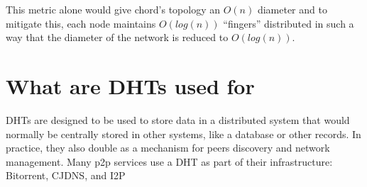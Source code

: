 This metric alone would give chord's topology an $O(n)$ diameter 
and to mitigate this, each node maintains $O(log(n))$ ``fingers''
 distributed in such a way that the diameter of the network is reduced to $O(log(n))$.

\section{What are DHTs used for}

DHTs are designed to be used to store data in a distributed system that would normally be centrally stored in other systems, like a database or other records.
In practice, they also double as a mechanism for peers discovery and network management.
Many p2p services use a DHT as part of their infrastructure: Bitorrent\cite{jimenez2011kademlia}, CJDNS\cite{hodson2013meshnet}, and I2P\cite{zantout2011i2p}
